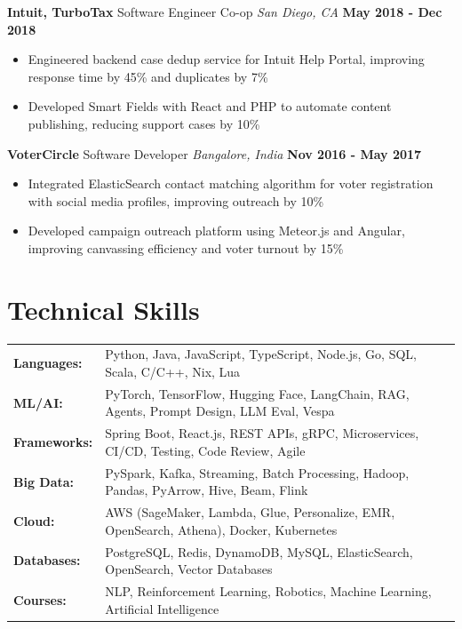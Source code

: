 \documentclass[10pt, letterpaper]{article}
\newcommand{\jobentry}[4]{
  \noindent\textbf{#1} \hfill #2 \hfill \textit{#3} \hfill \textbf{#4}
}
\begin{document}
\jobentry{Intuit, TurboTax}{Software Engineer Co-op}{San Diego, CA}{May 2018 - Dec 2018}
\begin{itemize}
	\item Engineered backend case dedup service for Intuit Help Portal, improving response time by 45\% and duplicates by 7\%
	\item Developed Smart Fields with React and PHP to automate content publishing, reducing support cases by 10\%
\end{itemize}

\jobentry{VoterCircle}{Software Developer}{Bangalore, India}{Nov 2016 - May 2017}
\begin{itemize}
	\item Integrated ElasticSearch contact matching algorithm for voter registration with social media profiles, improving outreach by 10\%
	\item Developed campaign outreach platform using Meteor.js and Angular, improving canvassing efficiency and voter turnout by 15\%
\end{itemize}

\section{Technical Skills}
\noindent
\begin{tabularx}{\textwidth}{@{} l X @{}}
	\textbf{Languages:}  & Python, Java, JavaScript, TypeScript, Node.js, Go, SQL, Scala, C/C++, Nix, Lua                    \\
	\textbf{ML/AI:}      & PyTorch, TensorFlow, Hugging Face, LangChain, RAG, Agents, Prompt Design, LLM Eval, Vespa         \\
	\textbf{Frameworks:} & Spring Boot, React.js, REST APIs, gRPC, Microservices, CI/CD, Testing, Code Review, Agile         \\
	\textbf{Big Data:}   & PySpark, Kafka, Streaming, Batch Processing, Hadoop, Pandas, PyArrow, Hive, Beam, Flink           \\
	\textbf{Cloud:}      & AWS (SageMaker, Lambda, Glue, Personalize, EMR, OpenSearch, Athena), Docker, Kubernetes           \\
	\textbf{Databases:}  & PostgreSQL, Redis, DynamoDB, MySQL, ElasticSearch, OpenSearch, Vector Databases                   \\
	\textbf{Courses:}    & NLP, Reinforcement Learning, Robotics, Machine Learning, Artificial Intelligence                  \\
\end{tabularx}
\end{document}
